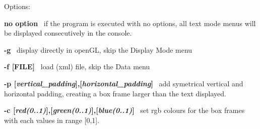 Options\+:


\begin{DoxyItemize}
\item {\bfseries no option}~\newline
 if the program is executed with no options, all text mode menus will be displayed consecutively in the console. 
\item {\bfseries -\/g}~\newline
 display directly in open\+GL, skip the Display Mode menu 
\item {\bfseries -\/f \mbox{[}F\+I\+LE\mbox{]}}~\newline
 load (xml) file, skip the Data menu 
\item {\bfseries -\/p \mbox{[}{\itshape vertical\+\_\+padding}\mbox{]},\mbox{[}{\itshape horizontal\+\_\+padding}\mbox{]}}~\newline
 add symetrical vertical and horizontal padding, creating a box frame larger than the text displayed. 
\item {\bfseries -\/c \mbox{[}{\itshape red(0..1)}\mbox{]},\mbox{[}{\itshape green(0..1)}\mbox{]},\mbox{[}{\itshape blue(0..1)}\mbox{]}}~\newline
 set rgb colours for the box frames with each values in range \mbox{[}0,1\mbox{]}. 
\end{DoxyItemize}